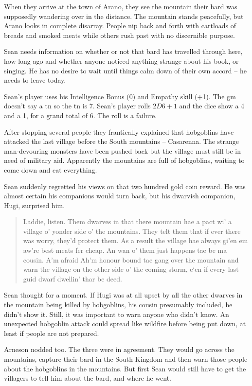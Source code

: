 \begin{exampletext}

When they arrive at the town of Arano, they see the mountain their bard was supposedly wandering over in the distance.
The mountain stands peacefully, but Arano looks in complete disarray.
People nip back and forth with cartloads of breads and smoked meats while others rush past with no discernible purpose.

Sean needs information on whether or not that bard has travelled through here, how long ago and whether anyone noticed anything strange about his book, or singing.
He has no desire to wait until things calm down of their own accord -- he needs to leave today.

Sean's player uses his Intelligence Bonus (0) and Empathy \gls{skill} (+1).
The \gls{gm} doesn't say a \gls{tn} so the \gls{tn} is 7.
Sean's player rolls $2D6+1$ and the dice show a 4 and a 1, for a grand total of 6.
The roll is a failure.

After stopping several people they frantically explained that hobgoblins have attacked the last village before the South mountains -- Casarenna.
The strange man-devouring monsters have been pushed back but the village must still be in need of military aid.
Apparently the mountains are full of hobgoblins, waiting to come down and eat everything.

Sean suddenly regretted his views on that two hundred gold coin reward.
He was almost certain his companions would turn back, but his dwarvish companion, Hugi, surprised him.

  \begin{quotation}
  Laddie, listen.
  Them dwarves in that there mountain hae a pact wi' a village o' yonder side o' the mountains.
  They telt them that if ever there was worry, they'd protect them.
  As a result the village hae always gi'en em aw're best meats fer cheap.
  An wan o' them just happens tae be ma cousin.
  A'm afraid Ah'm honour bound tae gang over the mountain and warn the village on the other side o' the coming storm, e`en if every last guid dwarf dwellin' thar be deed.
  \end{quotation}

Sean thought for a moment.
If Hugi was at all upset by all the other dwarves in the mountain being killed by hobgoblins, his cousin presumably included, he didn't show it.
Still, it was important to warn anyone who didn't know.
An unexpected hobgoblin attack could spread like wildfire before being put down, at least if people are not prepared.

Arneson nodded too.
The three were in agreement.
They would go across the mountains, capture their bard in the South Kingdom and then warn those people about the hobgoblins in the mountains.
But first Sean would still have to get the villagers to tell him about the bard, and where he went.
\end{exampletext}

